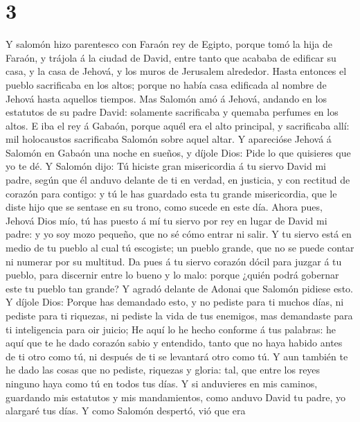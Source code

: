 \hypertarget{section-2}{%
\section{3}\label{section-2}}

 Y salomón hizo parentesco con Faraón rey de Egipto, porque
tomó la hija de Faraón, y trájola á la ciudad de David, entre tanto que
acababa de edificar su casa, y la casa de Jehová, y los muros de
Jerusalem alrededor.  Hasta entonces el pueblo sacrificaba
en los altos; porque no había casa edificada al nombre de Jehová hasta
aquellos tiempos.  Mas Salomón amó á Jehová, andando en los
estatutos de su padre David: solamente sacrificaba y quemaba perfumes en
los altos.  E iba el rey á Gabaón, porque aquél era el alto
principal, y sacrificaba allí: mil holocaustos sacrificaba Salomón sobre
aquel altar.  Y aparecióse Jehová á Salomón en Gabaón una
noche en sueños, y díjole Dios: Pide lo que quisieres que yo te dé.
 Y Salomón dijo: Tú hiciste gran misericordia á tu siervo
David mi padre, según que él anduvo delante de ti en verdad, en
justicia, y con rectitud de corazón para contigo: y tú le has guardado
esta tu grande misericordia, que le diste hijo que se sentase en su
trono, como sucede en este día.  Ahora pues, Jehová Dios
mío, tú has puesto á mí tu siervo por rey en lugar de David mi padre: y
yo soy mozo pequeño, que no sé cómo entrar ni salir.  Y tu
siervo está en medio de tu pueblo al cual tú escogiste; un pueblo
grande, que no se puede contar ni numerar por su multitud. 
Da pues á tu siervo corazón dócil para juzgar á tu pueblo, para
discernir entre lo bueno y lo malo: porque ¿quién podrá gobernar este tu
pueblo tan grande?  Y agradó delante de Adonai que Salomón
pidiese esto.  Y díjole Dios: Porque has demandado esto, y
no pediste para ti muchos días, ni pediste para ti riquezas, ni pediste
la vida de tus enemigos, mas demandaste para ti inteligencia para oir
juicio;  He aquí lo he hecho conforme á tus palabras: he
aquí que te he dado corazón sabio y entendido, tanto que no haya habido
antes de ti otro como tú, ni después de ti se levantará otro como tú.
 Y aun también te he dado las cosas que no pediste,
riquezas y gloria: tal, que entre los reyes ninguno haya como tú en
todos tus días.  Y si anduvieres en mis caminos, guardando
mis estatutos y mis mandamientos, como anduvo David tu padre, yo
alargaré tus días.  Y como Salomón despertó, vió que era
